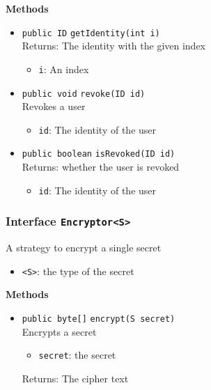 \textbf{Methods}
\begin{itemize}
\item \lstinline|public ID| \lstinline|getIdentity|\lstinline|(int i)|\\
Returns: The identity with the given index
\begin{itemize}
\item \lstinline|i|: An index
\end{itemize}



\item \lstinline|public void| \lstinline|revoke|\lstinline|(ID id)|\\
Revokes a user
\begin{itemize}
\item \lstinline|id|: The identity of the user
\end{itemize}



\item \lstinline|public boolean| \lstinline|isRevoked|\lstinline|(ID id)|\\
Returns: whether the user is revoked
\begin{itemize}
\item \lstinline|id|: The identity of the user
\end{itemize}



\end{itemize}

\subsubsection{Interface \lstinline|Encryptor<S>|}
A strategy to encrypt a single secret \\



\begin{itemize}
\item \lstinline|<S>|: the type of the secret
\end{itemize}



\textbf{Methods}
\begin{itemize}
\item \lstinline|public byte[]| \lstinline|encrypt|\lstinline|(S secret)|\\
Encrypts a secret
\begin{itemize}
\item \lstinline|secret|: the secret
\end{itemize}

Returns: The cipher text

\end{itemize}

